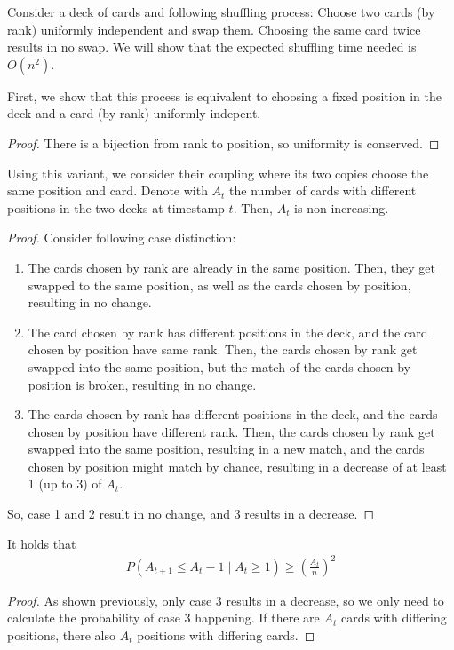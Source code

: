 \begin{aufgabe}
 Consider a deck of cards and following shuffling process: 
 Choose two cards (by rank) uniformly independent and swap them. Choosing the same card twice results in no swap.
 We will show that the expected shuffling time needed is $O(n^2)$.
 
 First, we show that this process is equivalent to choosing a fixed position in the deck and a card (by rank) uniformly indepent.
 \begin{proof}
     There is a bijection from rank to position, so uniformity is conserved.
 \end{proof}
 Using this variant, we consider their coupling where its two copies choose the same position and card.
 Denote with $A_t$ the number of cards with different positions in the two decks at timestamp $t$.
 Then, $A_t$ is non-increasing.
 \begin{proof}
     Consider following case distinction:
     \begin{enumerate}
         \item The cards chosen by rank are already in the same position. 
         Then, they get swapped to the same position, as well as the cards chosen by position, resulting in no change.
         \item The card chosen by rank has different positions in the deck, and the card chosen by position have same rank.
         Then, the cards chosen by rank get swapped into the same position, but the match of the cards chosen by position is broken, resulting in no change.
         \item The cards chosen by rank has different positions in the deck, and the cards chosen by position have different rank.
         Then, the cards chosen by rank get swapped into the same position, resulting in a new match, and the cards chosen by position might match by chance, resulting in a decrease of at least 1 (up to 3) of $A_t$.
     \end{enumerate}
     So, case 1 and 2 result in no change, and $3$ results in a decrease.
 \end{proof}
 It holds that
 \begin{align*}
     P(A_{t+1} \leq A_t - 1 \mid A_t \geq 1) \geq \left( \frac{A_t}{n}\right)^2
 \end{align*}
 \begin{proof}
     As shown previously, only case 3 results in a decrease, so we only need to calculate the probability of case 3 happening.
     If there are $A_t$ cards with differing positions, there also $A_t$ positions with differing cards.

\end{proof}
\end{aufgabe}
